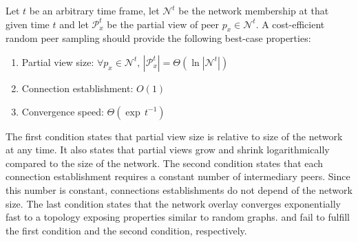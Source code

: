 \begin{problem}
  Let $t$ be an arbitrary time frame, let $\mathcal{N}^t$ be the
  network membership at that given time $t$ and let $\mathcal{P}_x^t$
  be the partial view of peer $p_x \in \mathcal{N}^t$.  A
  cost-efficient random peer sampling should provide the following
  best-case properties:
  \begin{enumerate}
  \item  \begin{center}
    Partial view size: \hfill
    $\forall p_x \in \mathcal{N}^t,\, |\mathcal{P}_x^t| = \Theta (\ln
    |\mathcal{N}^t|)$
  \end{center}
  
\item \begin{center}
    Connection establishment: \hfill $O(1)$
  \end{center}
 
\item  \begin{center}
    Convergence speed: \hfill $\Theta(\exp \, t^{-1})$
  \end{center}
  \end{enumerate}
\end{problem}

The first condition states that partial view size is relative to size of the
network at any time. It also states that partial views grow and shrink
logarithmically compared to the size of the network. The second condition
states that each connection establishment requires a constant number of
intermediary peers. Since this number is constant, connections establishments
do not depend of the network size. The last condition states that the network
overlay converges exponentially fast to a topology exposing properties similar
to random graphs.  \CYCLON and \SCAMP fail to fulfill the first condition
and the second condition, respectively.

